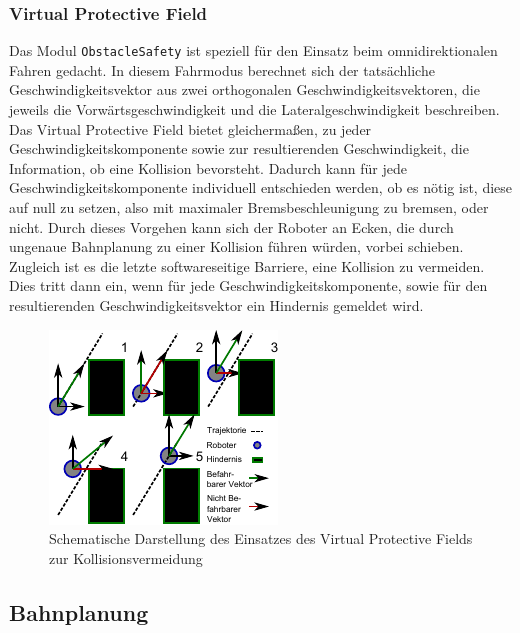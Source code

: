 \subsubsection{Virtual Protective Field}
\label{bahnplanung_virtual_protective_field_sec}

Das Modul \lstinline{ObstacleSafety} ist speziell für den Einsatz beim omnidirektionalen Fahren gedacht. In diesem Fahrmodus berechnet sich der tatsächliche Geschwindigkeitsvektor aus zwei orthogonalen Geschwindigkeitsvektoren, die jeweils die Vorwärtsgeschwindigkeit und die Lateralgeschwindigkeit beschreiben.
Das Virtual Protective Field bietet gleichermaßen, zu jeder Geschwindigkeitskomponente sowie zur resultierenden Geschwindigkeit, die Information, ob eine Kollision bevorsteht.
Dadurch kann für jede Geschwindigkeitskomponente individuell entschieden werden, ob es nötig ist, diese auf null zu setzen, also mit maximaler Bremsbeschleunigung zu bremsen, oder nicht.
Durch dieses Vorgehen kann sich der Roboter an Ecken, die durch ungenaue Bahnplanung zu einer Kollision führen würden, vorbei schieben.
Zugleich ist es die letzte softwareseitige Barriere, eine Kollision zu vermeiden.
Dies tritt dann ein, wenn für jede Geschwindigkeitskomponente, sowie für den resultierenden Geschwindigkeitsvektor ein Hindernis gemeldet wird.

\begin{figure}
	\label{fig:bahnplanung_umsetzung_vpf}
	\centering
	\includegraphics[scale=2]{graphics/SCHEMA-vpf.pdf}
	\caption[Einsatz des Virtual Protective Fields]{Schematische Darstellung des Einsatzes des Virtual Protective Fields zur Kollisionsvermeidung}
\end{figure}

\subsection{Bahnplanung}
\label{bahnplanung_subsec}
\authorsection{\editortobias}


